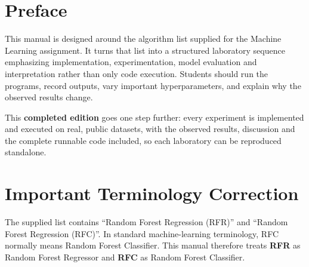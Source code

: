 
\section*{Preface}
{}
This manual is designed around the algorithm list supplied for the Machine Learning
assignment. It turns that list into a structured laboratory sequence emphasizing
implementation, experimentation, model evaluation and interpretation rather than only
code execution. Students should run the programs, record outputs, vary important
hyperparameters, and explain why the observed results change.

This \textbf{completed edition} goes one step further: every experiment is implemented
and executed on real, public datasets, with the observed results, discussion and the
complete runnable code included, so each laboratory can be reproduced standalone.

\section*{Important Terminology Correction}
{}
The supplied list contains ``Random Forest Regression (RFR)'' and ``Random Forest
Regression (RFC)''. In standard machine-learning terminology, RFC normally means
Random Forest Classifier. This manual therefore treats \textbf{RFR} as Random Forest
Regressor and \textbf{RFC} as Random Forest Classifier.

